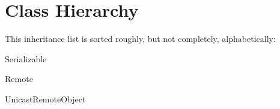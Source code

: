 \section{Class Hierarchy}
This inheritance list is sorted roughly, but not completely, alphabetically\-:\begin{DoxyCompactList}
\item {}
\item Serializable\begin{DoxyCompactList}
\item {}
\end{DoxyCompactList}
\item {}
\item Remote\begin{DoxyCompactList}
\item {}
\begin{DoxyCompactList}
\item {}
\end{DoxyCompactList}
\end{DoxyCompactList}
\item Unicast\-Remote\-Object\begin{DoxyCompactList}
\item {}
\end{DoxyCompactList}
\end{DoxyCompactList}
